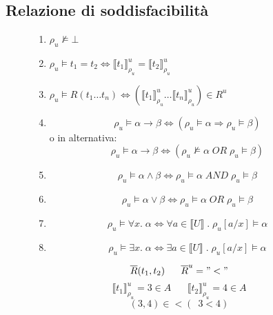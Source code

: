 \documentclass{article}
\theoremstyle{break}
\theoremstyle{break}
\theoremstyle{break}
\theoremstyle{break}
\begin{document}
  \subsection{Relazione di soddisfacibilità}
  \begin{figure}[H]
    \begin{definition}
      \begin{enumerate}
        \item \( \rho_u \not\models \bot \) 
        \item \( \rho_u \models t_1 = t_2 \Leftrightarrow \llbracket t_1\rrbracket^u_{\rho_u}= \llbracket t_2\rrbracket^u_{\rho_u} \) 
        \item \( \rho_u \models R(t_1 \ldots t_n) \Leftrightarrow (\llbracket t_1\rrbracket^u_{\rho_u} \ldots \llbracket t_n\rrbracket^u_{\rho_u}) \in R^u \) 
        \item \[
            \rho_u \models \alpha \to \beta \Leftrightarrow (\rho_u \models \alpha \Rightarrow \rho_u \models \beta)
          \] 
          o in alternativa:
          \[
            \rho_u \models \alpha \to \beta \Leftrightarrow (\rho_u \not\models \alpha \;OR\; \rho_u \models \beta)
          \] 
        \item \[
            \rho_u \models \alpha \wedge \beta \Leftrightarrow \rho_u \models \alpha \;AND\; \rho_u \models \beta
          \]
        \item \[
            \rho_u \models \alpha \vee \beta \Leftrightarrow \rho_u \models \alpha \;OR\; \rho_u \models \beta
          \] 
        \item \[
            \rho_u \models \forall x.\; \alpha \Leftrightarrow \forall a \in \llbracket U\rrbracket \;.\; \rho_u[a/x] \models \alpha
          \]
        \item \[
            \rho_u \models \exists x.\; \alpha \Leftrightarrow \exists a \in \llbracket U\rrbracket \;.\; \rho_u[a/x] \models \alpha
          \]

      \end{enumerate}
    \end{definition}
  \end{figure}
  \begin{figure}[H]
    \begin{example}
      \[
        \overline{R}(t_1,t_2) \;\;\;\;\;\; \overline{R}^u = "<" 
      \]  
      \[
        \llbracket t_1\rrbracket^u_{\rho_u} = 3 \in A \;\;\;\;\;\; \llbracket t_2\rrbracket^u_{\rho_u} = 4 \in  A
      \] 
      \[
        (3,4) \in < (~\; 3<4)
      \] 
    \end{example}
  \end{figure}
\end{document}
